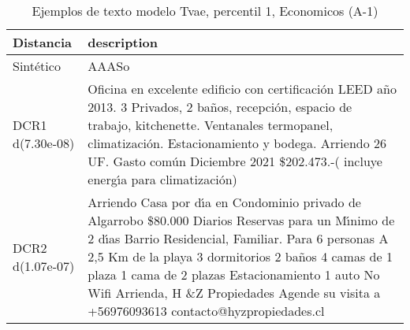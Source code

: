 \begin{table}[H]
\centering
\fontsize{10}{14}\selectfont
\caption{Ejemplos de texto modelo Tvae, percentil 1, Economicos (A-1)}
\label{table-example-economicos-a-1-tvae-1p-text}
\begin{tabular}{|l|m{35em}|}
\hline
\rowcolor[gray]{0.8}
Distancia & description \\
\hline Sintético & AAASo \\
\hline DCR1 d(7.30e-08) & Oficina en excelente edificio con certificaci\'on LEED a\~no 2013. 3 Privados, 2 ba\~nos, recepci\'on, espacio de trabajo, kitchenette. Ventanales termopanel, climatizaci\'on. Estacionamiento y bodega. Arriendo 26 UF. Gasto com\'un Diciembre 2021 \$202.473.-( incluye energ{\'\i}a para climatizaci\'on) \\
\hline DCR2 d(1.07e-07) & Arriendo Casa por d{\'\i}a en Condominio privado de Algarrobo \$80.000 Diarios Reservas para un M{\'\i}nimo de 2 d{\'\i}as Barrio Residencial, Familiar. Para 6 personas A 2,5 Km de la playa 3 dormitorios 2 ba\~nos 4 camas de 1 plaza 1 cama de 2 plazas Estacionamiento 1 auto No Wifi Arrienda, H \&Z Propiedades Agende su visita a +56976093613 contacto@hyzpropiedades.cl \\
\hline
\end{tabular}
\end{table}
